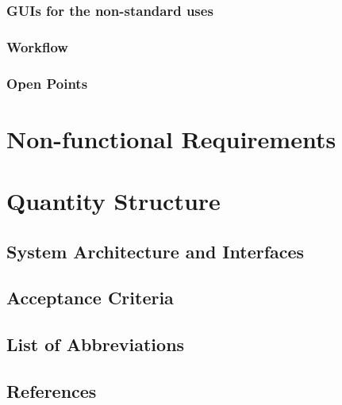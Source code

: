 \documentclass[12pt]{article}
\theoremstyle{definition}
\begin{document}
\subsubsection{GUIs for the non-standard uses}
\subsubsection{Workflow}
\subsubsection{Open Points}
\pagebreak
\section{Non-functional Requirements}
\pagebreak
\section{Quantity Structure}
\pagebreak
\subsection{System Architecture and Interfaces}
\pagebreak
\subsection{Acceptance Criteria}
\pagebreak
\subsection{List of Abbreviations}
\pagebreak
\subsection{References}
\end{document}
